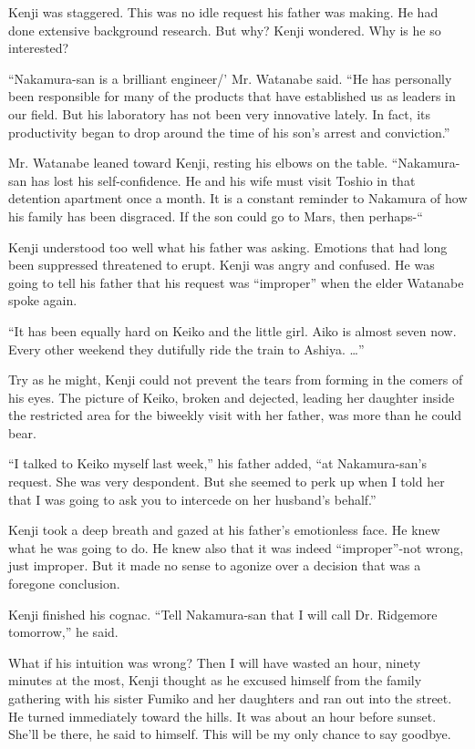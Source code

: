\documentclass[]{article}
\begin{document}
{Kenji was staggered.  This was no idle request his father was making.  He had done extensive background research.  But why? Kenji wondered.  Why is he so interested?

“Nakamura-san is a brilliant engineer/’ Mr.  Watanabe said.  “He has personally been responsible for many of the products that have established us as leaders in our field.  But his laboratory has not been very innovative lately.  In fact, its productivity began to drop around the time of his son’s arrest and conviction.”

Mr.  Watanabe leaned toward Kenji, resting his elbows on the table.  “Nakamura-san has lost his self-confidence.  He and his wife must visit Toshio in that detention apartment once a month.  It is a constant reminder to Nakamura of how his family has been disgraced.  If the son could go to Mars, then perhaps-“

Kenji understood too well what his father was asking.  Emotions that had long been suppressed threatened to erupt.  Kenji was angry and confused.  He was going to tell his father that his request was “improper” when the elder Watanabe spoke again.

“It has been equally hard on Keiko and the little girl.  Aiko is almost seven now.  Every other weekend they dutifully ride the train to Ashiya.  …”

Try as he might, Kenji could not prevent the tears from forming in the comers of his eyes.  The picture of Keiko, broken and dejected, leading her daughter inside the restricted area for the biweekly visit with her father, was more than he could bear.

“I talked to Keiko myself last week,” his father added, “at Nakamura-san’s request.  She was very despondent.  But she seemed to perk up when I told her that I was going to ask you to intercede on her husband’s behalf.”

Kenji took a deep breath and gazed at his father’s emotionless face.  He knew what he was going to do.  He knew also that it was indeed “improper”-not wrong, just improper.  But it made no sense to agonize over a decision that was a foregone conclusion.

Kenji finished his cognac.  “Tell Nakamura-san that I will call Dr.  Ridgemore tomorrow,” he said.

What if his intuition was wrong? Then I will have wasted an hour, ninety minutes at the most, Kenji thought as he excused himself from the family gathering with his sister Fumiko and her daughters and ran out into the street.  He turned immediately toward the hills.  It was about an hour before sunset.  She’ll be there, he said to himself.  This will be my only chance to say goodbye.

}
\end{document}

